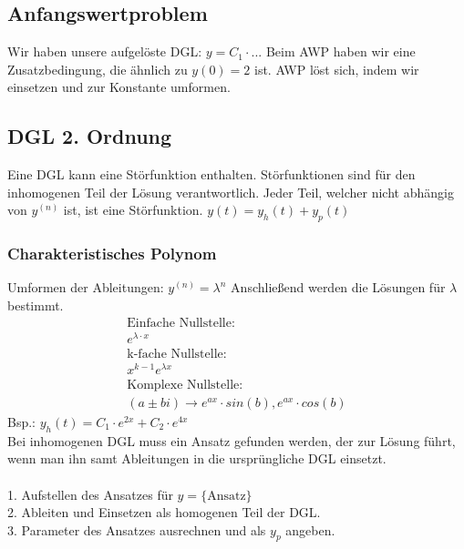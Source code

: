 \documentclass[a4paper, 11pt]{article}
\begin{document}
\begin{multicols}{3}
\begin{small}
			\subsection{Anfangswertproblem}
				Wir haben unsere aufgelöste DGL: $y = C_1 \cdot ...$
				Beim AWP haben wir eine Zusatzbedingung, die ähnlich zu $y(0) = 2$ ist. AWP löst sich, indem wir einsetzen und zur Konstante umformen.
		\subsection{DGL 2. Ordnung}	
			Eine DGL kann eine Störfunktion enthalten. Störfunktionen sind für den inhomogenen Teil der Lösung verantwortlich. Jeder Teil, welcher nicht abhängig von $y^{(n)}$ ist, ist eine Störfunktion. $y(t) = y_h(t) + y_p(t)$
			\subsubsection{Charakteristisches Polynom}
				Umformen der Ableitungen: $y^{(n)} = \lambda^n$
				Anschließend werden die Lösungen für $\lambda$ bestimmt.
				\begin{align*}
					\text{Einfache Nullstelle:}\\
					e^{\lambda \cdot x}\\
					\text{k-fache Nullstelle:}\\
					x^{k-1} e^{\lambda x}\\
					\text{Komplexe Nullstelle:}\\
					(a \pm bi) \rightarrow e^{ax} \cdot sin(b), e^{ax} \cdot cos(b)
				\end{align*}
				Bsp.: $y_h(t) = C_1 \cdot e^{2x} + C_2 \cdot e^{4x}$\\
				Bei inhomogenen DGL muss ein Ansatz gefunden werden, der zur Lösung führt, wenn man ihn samt Ableitungen in die ursprüngliche DGL einsetzt.\\
				\\
				1. Aufstellen des Ansatzes für $y = \{ \text{Ansatz} \}$\\
				2. Ableiten und Einsetzen als homogenen Teil der DGL.\\
				3. Parameter des Ansatzes ausrechnen und als $y_p$ angeben.
\end{small}
\end{multicols}
\end{document}
